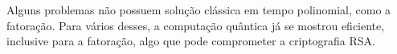 Alguns problemas não possuem solução clássica em tempo polinomial, como a fatoração.
Para vários desses, a computação quântica já se mostrou eficiente, inclusive para a fatoração, algo que pode comprometer a criptografia RSA.